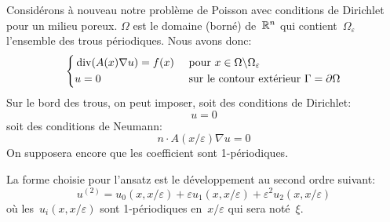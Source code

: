 Considérons à nouveau notre problème de Poisson avec conditions de Dirichlet pour un milieu poreux. $\Omega$ est le domaine (borné) de~$\mathbb R^n$ qui contient~$\Omega_\varepsilon$ l'ensemble des trous périodiques. Nous avons donc:
\begin{equation}
\left\{
\begin{aligned}
&\operatorname{div}(A(x)\nabla u) = f(x) &&\text{ pour } x\in\Omega\backslash\Omega_\varepsilon\\
&u=0 && \text{ sur le contour extérieur } \Gamma=\partial\Omega\\
\end{aligned}
\right.
\end{equation}
Sur le bord des trous, on peut imposer, soit des conditions de Dirichlet:
\begin{equation}u=0 \end{equation}
soit des conditions de Neumann:
\begin{equation}n\cdot A(x/\varepsilon)\nabla u=0 \end{equation}
On supposera encore que les coefficient sont 1-périodiques.

\medskip
{}

La forme choisie pour l'ansatz est le développement au second ordre suivant:
\begin{equation}u^{(2)} = u_0(x,x/\varepsilon)+\varepsilon u_1(x,x/\varepsilon) + \varepsilon^2 u_2(x,x/\varepsilon)\end{equation}
où les~$u_i(x,x/\varepsilon)$ sont 1-périodiques en~$x/\varepsilon$ qui sera noté~$\xi$.

